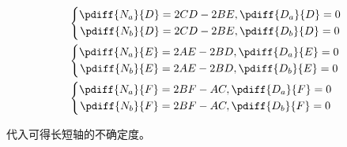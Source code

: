 \documentclass{article}
\begin{document}
\begin{align*}
  &\left\{
    \begin{aligned}
      \pdiff{N_a}{D}&=2CD-2BE,\pdiff{D_a}{D}=0\\
      \pdiff{N_b}{D}&=2CD-2BE,\pdiff{D_b}{D}=0\\ 
    \end{aligned}
  \right.\\
  &\left\{
    \begin{aligned}
      \pdiff{N_a}{E}&=2AE-2BD,\pdiff{D_a}{E}=0\\
      \pdiff{N_b}{E}&=2AE-2BD,\pdiff{D_b}{E}=0\\ 
    \end{aligned}
  \right.\\
  &\left\{
    \begin{aligned}
      \pdiff{N_a}{F}&=2BF-AC,\pdiff{D_a}{F}=0\\
      \pdiff{N_b}{F}&=2BF-AC,\pdiff{D_b}{F}=0\\ 
    \end{aligned}
  \right.
\end{align*}\par
代入可得长短轴的不确定度。
\end{document}

